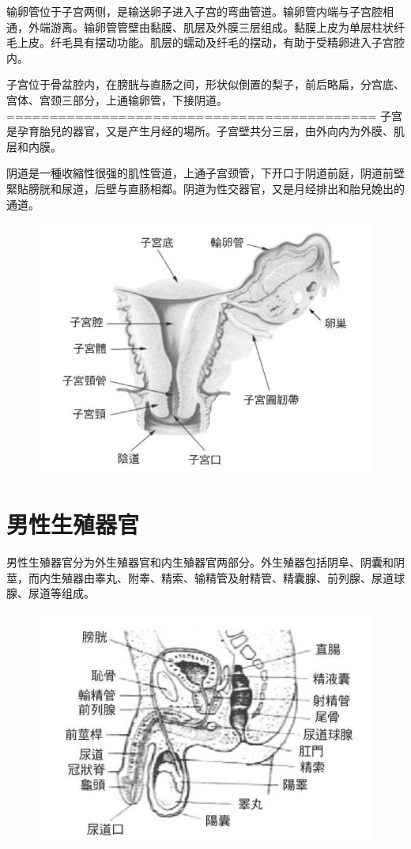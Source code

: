 \documentclass[12pt,UTF8]{ctexbook}
\begin{document}
输卵管位于子宫两侧，是输送卵子进入子宫的弯曲管道。输卵管内端与子宫腔相通，外端游离。输卵管管壁由黏膜、肌层及外膜三层组成。黏膜上皮为单层柱状纤毛上皮。纤毛具有摆动功能。肌层的蠕动及纤毛的摆动，有助于受精卵进入子宫腔内。

子宫位于骨盆腔内，在膀胱与直肠之间，形状似倒置的梨子，前后略扁，分宫底、宫体、宫颈三部分，上通输卵管，下接阴道。
===========================================
子宫是孕育胎兒的器官，又是产生月经的場所。子宫壁共分三层，由外向内为外膜、肌层和内膜。

阴道是一種收縮性很强的肌性管道，上通子宫颈管，下开口于阴道前庭，阴道前壁緊貼膀胱和尿道，后壁与直肠相鄰。阴道为性交器官，又是月经排出和胎兒娩出的通道。

\begin{figure}[htbp]
	\centering
	\includegraphics[width=0.7\linewidth]{3}
	\caption{}
\end{figure}

\section{男性生殖器官}

男性生殖器官分为外生殖器官和内生殖器官两部分。外生殖器包括阴阜、阴囊和阴莖，而内生殖器由睾丸、附睾、精索、输精管及射精管、精囊腺、前列腺、尿道球腺、尿道等组成。

\begin{figure}[htbp]
	\centering
	\includegraphics[width=0.7\linewidth]{4}
	\caption{}
\end{figure}
\end{document}
